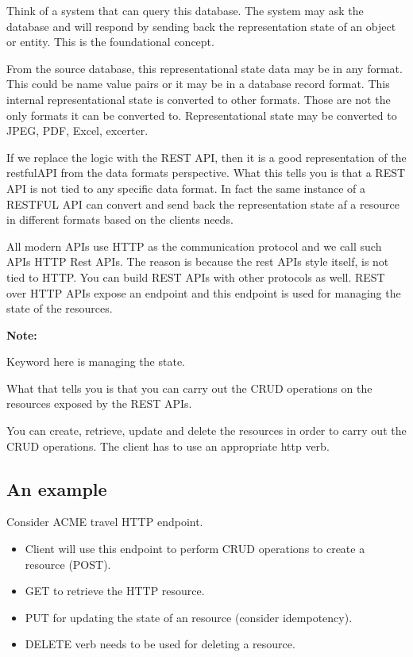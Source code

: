 \documentclass[a4paper, 11pt]{book}
\newenvironment{note}{
    \begin{siderule}
        \textbf{Note: }
        }{
    \end{siderule}
}
\begin{document}
    Think of a system that can query this database.
    The system may ask the database and will respond by sending back the representation state of an object or entity.
    This is the foundational concept.

    From the source database, this representational state data may be in any format.
    This could be name value pairs or it may be in a database record format.
    This internal representational state is converted to other formats.
    Those are not the only formats it can be converted to.
    Representational state may be converted to JPEG, PDF, Excel, excerter.

    If we replace the logic with the REST API, then it is a good representation of the restfulAPI from the data formats perspective.
    What this tells you is that a REST API is not tied to any specific data format.
    In fact the same instance of a RESTFUL API can convert and send back the representation state af a resource in different formats based on the clients needs.

    All modern APIs use HTTP as the communication protocol and we call such APIs HTTP Rest APIs.
    The reason is because the rest APIs style itself, is not tied to HTTP.
    You can build REST APIs with other protocols as well.
    REST over HTTP APIs expose an endpoint and this endpoint is used for managing the state of the resources.

    \begin{note}
        Keyword here is managing the state.
    \end{note}

    What that tells you is that you can carry out the CRUD operations on the resources exposed by the REST APIs.

    You can create, retrieve, update and delete the resources in order to carry out the CRUD operations.
    The client has to use an appropriate http verb.

    \subsection{An example}
    Consider ACME travel HTTP endpoint.
    \begin{itemize}
        \item Client will use this endpoint to perform CRUD operations to create a resource (POST).
        \item GET to retrieve the HTTP resource.
        \item PUT for updating the state of an resource (consider idempotency).
        \item DELETE verb needs to be used for deleting a resource.
    \end{itemize}
\end{document}
